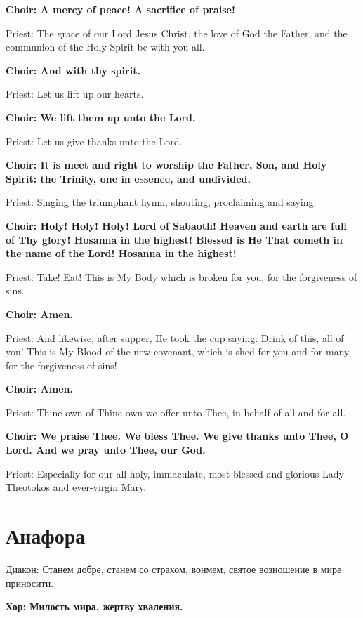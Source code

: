 \documentclass[12pt,a4paper,titlepage]{report}
\begin{document}
\begin{paracol}[1]{2}
	\textbf{Choir: A mercy of peace! A sacrifice of praise!}
	
	Priest: The grace of our Lord Jesus Christ, the love of God the Father, and the communion of the Holy Spirit be with you all.
	
	\textbf{Choir: And with thy spirit.}
	
	Priest: Let us lift up our hearts.
	
	\textbf{Choir: We lift them up unto the Lord.}
	
	Priest: Let us give thanks unto the Lord.
	
	\textbf{Choir: It is meet and right to worship the Father, Son, and Holy Spirit: the Trinity, one in essence, and undivided.}
	
	Priest: Singing the triumphant hymn, shouting, proclaiming and saying:
	
	\textbf{Choir: Holy! Holy! Holy! Lord of Sabaoth! Heaven and earth are full of Thy glory! Hosanna in the highest! Blessed is He That cometh in the name of the Lord! Hosanna in the highest!}
	
	Priest: Take! Eat! This is My Body which is broken for you, for the forgiveness of sins.
	
	\textbf{Choir: Amen.}
	
	Priest: And likewise, after supper, He took the cup saying: Drink of this, all of you! This is My Blood of the new covenant, which is shed for you and for many, for the forgiveness of sins!
	
	\textbf{Choir: Amen.}
	
	Priest: Thine own of Thine own we offer unto Thee, in behalf of all and for all.
	
	\textbf{Choir: We praise Thee. We bless Thee. We give thanks unto Thee, O Lord. And we pray unto Thee, our God.}
	
	Priest: Especially for our all-holy, immaculate, most blessed and glorious Lady Theotokos and ever-virgin Mary.
	
	\switchcolumn[1]
	
	\section*{Анафора}
	
	Диакон: Станем добре, станем со страхом, вонмем, святое возношение в мире приносити.
	
	\textbf{Хор: Милость мира, жертву хваления.}
	

\end{paracol}
\end{document}
